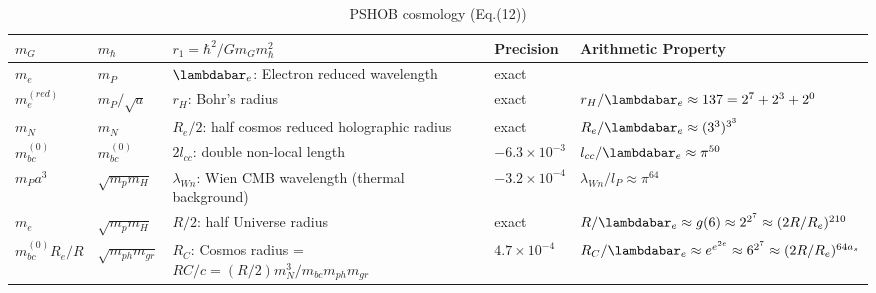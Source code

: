 \documentclass[a4paper,9pt]{article}
\newcounter{col}
\begin{document}
 
\begin{table}
\caption[Table \ref{tab:5:table5}: PSHOB Cosmology.]{PSHOB cosmology (Eq.(12))}
\label{tab:5:table5}
  \hskip-2.0cm\begin{tabular}{lllll}
    \toprule
    \cmidrule(r){1-4}
    $m_G$ & $m_{\hbar}$    & $r_1 = \hbar^2/Gm_G m_{\hbar}^2$  & Precision &Arithmetic Property \\
    \midrule
    
    $m_e$ & $m_P $ & $\lambdabar_e$: Electron reduced wavelength   & exact & \\
    
    $m_e^{(red)}$ & $m_P/\sqrt a $ & $r_H$: Bohr's radius   & exact & $ r_H/\lambdabar_e \approx 137 = 2^7+2^3+2^0 $\\
    
    $m_N $ & $m_N$   & $R_e/2$: half cosmos reduced holographic radius  &  exact & $R_e/\lambdabar_e \approx (3^3)^{3^3}$ \\
    $m_{bc}^{(0)} $ & $m_{bc}^{(0)}$   & $2l_{cc}$: double non-local length & $-6.3 \times 10^{-3}$ & $ l_{cc}/\lambdabar_e \approx \pi^{50}$  \\
    $m_Pa^3 $ & $\sqrt {m_pm_H}$  &$\lambda_{Wn}$: Wien CMB wavelength (thermal background) & $-3.2 \times 10^{-4}$ &$\lambda_{Wn}/l_P \approx \pi^{64}$\\
    $m_e $ & $\sqrt {m_pm_H}$   & $R/2$: half Universe radius &exact& $R/\lambdabar_e \approx g(6) \approx 2^{2^7}\approx (2R/R_e)^{210}$   \\
    
    $m_{bc}^{(0)}R_e/R $ & $\sqrt{ m_{ph}m_{gr}}$   & $R_C$: Cosmos radius = $RC/c = (R/2)m_N^3/m_{bc}m_{ph}m_{gr}$ & $4.7 \times 10^{-4} $& $ R_C/\lambdabar_e \approx e^{e^{2e}} \approx 6^{2^7}\approx (2R/R_e)^{64a_s}  $\\
    
  
         
   \bottomrule
  \end{tabular}
\end{table}
\end{document}
